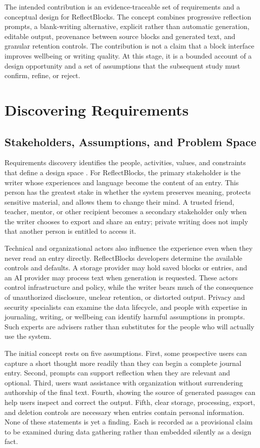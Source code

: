 \documentclass[sigconf,nonacm]{acmart}
\begin{document}
The intended contribution is an evidence-traceable set of requirements and a
conceptual design for ReflectBlocks. The concept combines progressive
reflection prompts, a blank-writing alternative, explicit rather than automatic
generation, editable output, provenance between source blocks and generated
text, and granular retention controls. The contribution is not a claim that a
block interface improves wellbeing or writing quality. At this stage, it is a
bounded account of a design opportunity and a set of assumptions that the
subsequent study must confirm, refine, or reject.

\section{Discovering Requirements}
\label{sec:discovering}

\subsection{Stakeholders, Assumptions, and Problem Space}

Requirements discovery identifies the people, activities, values, and
constraints that define a design space \cite{preece2023interaction}. For
ReflectBlocks, the primary stakeholder is the writer whose experiences and
language become the content of an entry. This person has the greatest stake in
whether the system preserves meaning, protects sensitive material, and allows
them to change their mind. A trusted friend, teacher, mentor, or other recipient
becomes a secondary stakeholder only when the writer chooses to export and
share an entry; private writing does not imply that another person is entitled
to access it.

Technical and organizational actors also influence the experience even when
they never read an entry directly. ReflectBlocks developers determine the
available controls and defaults. A storage provider may hold saved blocks or
entries, and an AI provider may process text when generation is requested.
These actors control infrastructure and policy, while the writer bears much of
the consequence of unauthorized disclosure, unclear retention, or distorted
output. Privacy and security specialists can examine the data lifecycle, and
people with expertise in journaling, writing, or wellbeing can identify harmful
assumptions in prompts. Such experts are advisers rather than substitutes for
the people who will actually use the system.

The initial concept rests on five assumptions. First, some prospective users
can capture a short thought more readily than they can begin a complete journal
entry. Second, prompts can support reflection when they are relevant and
optional. Third, users want assistance with organization without surrendering
authorship of the final text. Fourth, showing the source of generated passages
can help users inspect and correct the output. Fifth, clear storage, processing,
export, and deletion controls are necessary when entries contain personal
information. None of these statements is yet a finding. Each is recorded as a
provisional claim to be examined during data gathering rather than embedded
silently as a design fact.
\end{document}
